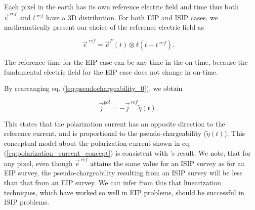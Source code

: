 \documentclass[extra,mreferee]{gji}
\renewcommand {\j}  { {\vec j} }
\newcommand {\e}  { {\vec e} }
\newcommand{\peta}{\tilde{\eta}}
\newcommand{\eref}{\e^{\ ref}}
\newcommand{\jref}{\j^{\ ref}}
\begin{document}
Each pixel in the earth has its own reference electric field and time thus  both $\eref$ and $t^{\ ref}$ have a 3D distribution. 
For both EIP and ISIP cases, we mathematically present our choice of the reference electric field as
\begin{linenomath*}
\begin{equation}
  \eref = \e^{F}(t) \otimes \delta(t-t^{\ ref}). 
  \label{eq:reference_electricfield}
\end{equation}
\end{linenomath*}
The reference time for the EIP case can be any time in the on-time, because the fundamental electric field for the EIP case does not change in on-time. 

By rearranging eq. (\ref{eq:pseudochargeability_0}), we obtain 
\begin{linenomath*}
\begin{equation}
  \j^{pol} = -\jref\peta(t). 
  \label{eq:polarization_current_concept}
\end{equation}
\end{linenomath*}
This states that the polarization current has an opposite direction to the reference current, and is proportional to the pseudo-chargeability ($\peta(t)$). 
This conceptual model about the polarization current shown in eq. (\ref{eq:polarization_current_concept}) is consistent with \cite{seigel1959}'s result. We note, that for any pixel, even though  $\eref$  attains the same value for an ISIP survey as for an EIP survey, the pseudo-chargeability resulting from  an ISIP survey  will be less than that from an EIP survey. We can infer from this that  linearization techniques, which  have worked so well in EIP problems, should be successful in ISIP problems. 

\end{document}
